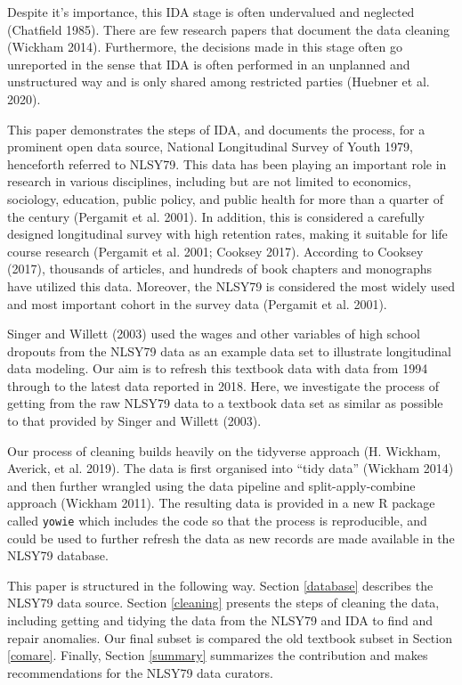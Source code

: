 \documentclass{article}
\begin{document}
Despite it's importance, this IDA stage is often undervalued and neglected (Chatfield 1985). There are few research papers that document the data cleaning (Wickham 2014). Furthermore, the decisions made in this stage often go unreported in the sense that IDA is often performed in an unplanned and unstructured way and is only shared among restricted parties (Huebner et al. 2020).

This paper demonstrates the steps of IDA, and documents the process, for a prominent open data source, National Longitudinal Survey of Youth 1979, henceforth referred to NLSY79. This data has been playing an important role in research in various disciplines, including but are not limited to economics, sociology, education, public policy, and public health for more than a quarter of the century (Pergamit et al. 2001). In addition, this is considered a carefully designed longitudinal survey with high retention rates, making it suitable for life course research (Pergamit et al. 2001; Cooksey 2017). According to Cooksey (2017), thousands of articles, and hundreds of book chapters and monographs have utilized this data. Moreover, the NLSY79 is considered the most widely used and most important cohort in the survey data (Pergamit et al. 2001).

Singer and Willett (2003) used the wages and other variables of high school dropouts from the NLSY79 data as an example data set to illustrate longitudinal data modeling. Our aim is to refresh this textbook data with data from 1994 through to the latest data reported in 2018. Here, we investigate the process of getting from the raw NLSY79 data to a textbook data set as similar as possible to that provided by Singer and Willett (2003).

Our process of cleaning builds heavily on the tidyverse approach (H. Wickham, Averick, et al. 2019). The data is first organised into ``tidy data'' (Wickham 2014) and then further wrangled using the data pipeline and split-apply-combine approach (Wickham 2011). The resulting data is provided in a new R package called \texttt{yowie} which includes the code so that the process is reproducible, and could be used to further refresh the data as new records are made available in the NLSY79 database.

This paper is structured in the following way. Section \ref{database} describes the NLSY79 data source. Section \ref{cleaning} presents the steps of cleaning the data, including getting and tidying the data from the NLSY79 and IDA to find and repair anomalies. Our final subset is compared the old textbook subset in Section \ref{comare}. Finally, Section \ref{summary} summarizes the contribution and makes recommendations for the NLSY79 data curators.
\end{document}
